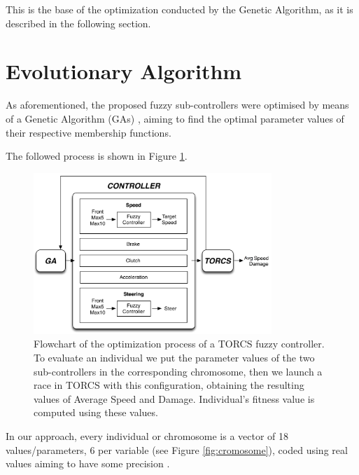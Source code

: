 \documentclass[10pt,journal,compsoc]{IEEEtran}
\begin{document}
This is the base of the optimization conducted by the Genetic Algorithm, as it is described in the following section.



\section{Evolutionary Algorithm}
\label{sec:GA_optimization}


As aforementioned, the proposed fuzzy sub-controllers were optimised by means of a Genetic Algorithm (GAs) \cite{GAs_Goldberg89}, aiming to find the optimal parameter values of their respective membership functions.

The followed process is shown in Figure \ref{fig:ga}. 

 \begin{figure}[!ht]
 	\label{fig:ga}
 	\begin{center}
 		\includegraphics[width=9cm]{fig/flowchart}
 	\end{center}
 	\caption{Flowchart of the optimization process of a TORCS fuzzy controller. To evaluate an individual we put the parameter values of the two sub-controllers in the corresponding chromosome, then we launch a race in TORCS with this configuration, obtaining the resulting values of Average Speed and Damage. Individual's fitness value is computed using these values.}
 \end{figure}

In our approach, every individual or chromosome is a vector of 18 values/parameters, 6 per variable (see Figure \ref {fig:cromosome}), coded using real values aiming to have some precision \cite{elsayed13}.
\end{document}

